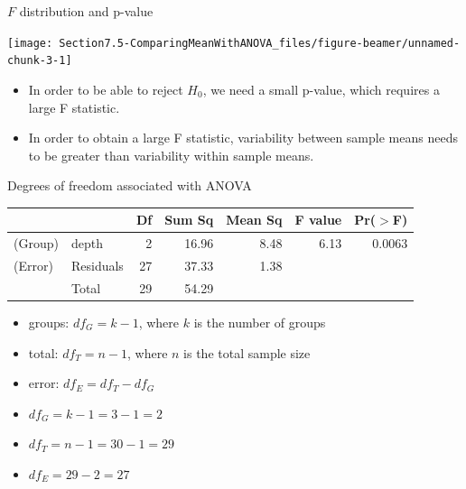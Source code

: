 \documentclass[
  ignorenonframetext,
]{beamer}
\begin{document}
\begin{frame}{\(F\) distribution and p-value}
\protect\hypertarget{f-distribution-and-p-value}{}

\begin{center}\texttt{[image: Section7.5-ComparingMeanWithANOVA\_files/figure-beamer/unnamed-chunk-3-1]} \end{center}

\begin{itemize}
\item
  In order to be able to reject \(H_0\), we need a small p-value, which
  requires a large F statistic.
\item
  In order to obtain a large F statistic, variability between sample
  means needs to be greater than variability within sample means.
\end{itemize}
\end{frame}

\begin{frame}{Degrees of freedom associated with ANOVA}
\protect\hypertarget{degrees-of-freedom-associated-with-anova}{}
\begin{center}
\begin{tabular}{llrrrrr}
\hline
            &           & Df    & Sum Sq    & Mean Sq   & F value   & Pr($>$F) \\ 
\hline
(\alert{G}roup)     & depth         & 2     & 16.96     & 8.48      & 6.13  & 0.0063 \\ 
(\alert{E}rror)     & Residuals     & 27    & 37.33     & 1.38      &       &  \\ 
\hline
            & \alert{T}otal & 29    & 54.29 \\
\end{tabular}
\end{center}

\begin{itemize}
\item groups: $df_G = k - 1$, where $k$ is the number of groups
\item total: $df_T = n - 1$, where $n$ is the total sample size
\item error: $df_E = df_T - df_G$
\end{itemize}

\pause

\begin{itemize}

\item $df_G = k - 1 = 3 - 1 = 2$ \\ 

\pause

\item $df_T = n - 1 = 30 - 1 = 29$

\pause

\item $df_E = 29 - 2 = 27$ \\

\end{itemize}
\end{frame}
\end{document}
